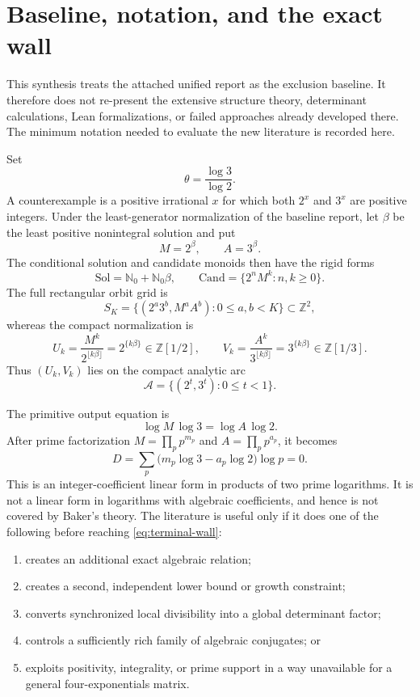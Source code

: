 \documentclass[10pt,letterpaper]{article}
\newcommand{\Z}{\mathbb Z}
\newcommand{\N}{\mathbb N}
\newcommand{\Sol}{\mathrm{Sol}}
\newcommand{\Cand}{\mathrm{Cand}}
\begin{document}
\clearpage
\section{Baseline, notation, and the exact wall}
\label{sec:baseline}

This synthesis treats the attached unified report as the exclusion baseline.  It therefore
does not re-present the extensive structure theory, determinant calculations, Lean
formalizations, or failed approaches already developed there.  The minimum notation needed
to evaluate the new literature is recorded here.

Set
\[
  \theta=\frac{\log 3}{\log 2}.
\]
A counterexample is a positive irrational \(x\) for which both \(2^x\) and \(3^x\) are
positive integers.  Under the least-generator normalization of the baseline report, let
\(\beta\) be the least positive nonintegral solution and put
\[
  M=2^\beta,\qquad A=3^\beta.
\]
The conditional solution and candidate monoids then have the rigid forms
\[
  \Sol=\N_0+\N_0\beta,
  \qquad
  \Cand=\{2^nM^k:n,k\geq0\}.
\]
The full rectangular orbit grid is
\[
  S_K=\{(2^a3^b,M^aA^b):0\leq a,b<K\}\subset\Z^2,
\]
whereas the compact normalization is
\[
  U_k=\frac{M^k}{2^{\lfloor k\beta\rfloor}}=2^{\{k\beta\}}\in\Z[1/2],
  \qquad
  V_k=\frac{A^k}{3^{\lfloor k\beta\rfloor}}=3^{\{k\beta\}}\in\Z[1/3].
\]
Thus \((U_k,V_k)\) lies on the compact analytic arc
\[
  \mathcal A=\{(2^t,3^t):0\leq t<1\}.
\]

The primitive output equation is
\[
  \log M\,\log 3=\log A\,\log 2.
\]
After prime factorization
\(M=\prod_p p^{m_p}\) and \(A=\prod_p p^{a_p}\), it becomes
\begin{equation}
  D=\sum_p\bigl(m_p\log 3-a_p\log 2\bigr)\log p=0.
  \label{eq:terminal-wall}
\end{equation}
This is an integer-coefficient linear form in products of two prime logarithms.  It is not a
linear form in logarithms with algebraic coefficients, and hence is not covered by Baker's
theory.  The literature is useful only if it does one of the following before reaching
\cref{eq:terminal-wall}:

\begin{enumerate}[label=(\alph*)]
\item creates an additional exact algebraic relation;
\item creates a second, independent lower bound or growth constraint;
\item converts synchronized local divisibility into a global determinant factor;
\item controls a sufficiently rich family of algebraic conjugates; or
\item exploits positivity, integrality, or prime support in a way unavailable for a general
four-exponentials matrix.
\end{enumerate}
\end{document}
